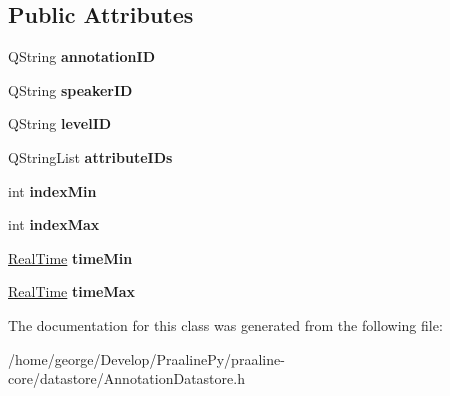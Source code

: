 \subsection*{Public Attributes}
\begin{DoxyCompactItemize}
\item 
\mbox{\label{class_annotation_datastore_1_1_selection_ad79a09e6397969743a1402a24f12fecd}} 
Q\+String {\bfseries annotation\+ID}
\item 
\mbox{\label{class_annotation_datastore_1_1_selection_a0a830746e0f28a4c659201831c050a79}} 
Q\+String {\bfseries speaker\+ID}
\item 
\mbox{\label{class_annotation_datastore_1_1_selection_a6ce08f2b077ed38fa3859331e1f98824}} 
Q\+String {\bfseries level\+ID}
\item 
\mbox{\label{class_annotation_datastore_1_1_selection_a62d5703fbb95ce21a1f7d6d8e04d3d47}} 
Q\+String\+List {\bfseries attribute\+I\+Ds}
\item 
\mbox{\label{class_annotation_datastore_1_1_selection_a9d0efb07ec0780a29a24d16cf1af9db3}} 
int {\bfseries index\+Min}
\item 
\mbox{\label{class_annotation_datastore_1_1_selection_a9b46c32f8fa21c0ebf5e587e0425176b}} 
int {\bfseries index\+Max}
\item 
\mbox{\label{class_annotation_datastore_1_1_selection_a9a7455650be991cfc0e6630602273e9d}} 
\hyperlink{struct_real_time}{Real\+Time} {\bfseries time\+Min}
\item 
\mbox{\label{class_annotation_datastore_1_1_selection_a863612bb96a0407b36fd6f5adc7e5cfd}} 
\hyperlink{struct_real_time}{Real\+Time} {\bfseries time\+Max}
\end{DoxyCompactItemize}


The documentation for this class was generated from the following file\+:\begin{DoxyCompactItemize}
\item 
/home/george/\+Develop/\+Praaline\+Py/praaline-\/core/datastore/Annotation\+Datastore.\+h\end{DoxyCompactItemize}
